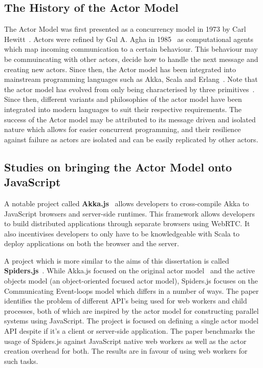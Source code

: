 \documentclass[12pt]{report}
\begin{document}
\subsection{The History of the Actor Model}
The Actor Model was first presented as a concurrency model in 1973 by Carl Hewitt~\cite{hewitt1973session}. Actors were refined by Gul A. Agha in 1985~\cite{agha1985actors} as computational agents which map incoming communication to a certain behaviour. This behaviour may be commuincating with other actors, decide how to handle the next message and creating new actors. Since then, the Actor model has been integrated into mainstream programming languages such as Akka, Scala and Erlang~\cite{43years}\cite{haller2012integration}. Note that the actor model has evolved from only being characterised by three primitives~\cite{agha1985actors}. Since then, different variants and philosophies of the actor model have been integrated into modern languages to suit their respective requirements. The success of the Actor model may be attributed to its message driven and isolated nature which allows for easier concurrent programming, and their resilience against failure as actors are isolated and can be easily replicated by other actors\cite{reactivemanifesto}.
\subsection{Studies on bringing the Actor Model onto JavaScript}
A notable project called \textbf{Akka.js}~\cite{stivan2015akka} allows developers to cross-compile Akka to JavaScript browsers and server-side runtimes. This framework allows developers to build distributed applications through separate browsers using WebRTC. It also incentivises developers to only have to be knowledgeable with Scala to deploy applications on both the browser and the server.

A project which is more similar to the aims of this dissertation is called \textbf{Spiders.js}~\cite{spidersjs}. While Akka.js focused on the original actor model~\cite{agha1985actors} and the active objects model (an object-oriented focused actor model), Spiders.js focuses on the Communicating Event-loops model which differs in a number of ways. The paper identifies the problem of different API's being used for web workers and child processes, both of which are inspired by the actor model for constructing parallel systems using JavaScript. The project is focused on defining a single actor model API despite if it's a client or server-side application. The paper benchmarks the usage of Spiders.js against JavaScript native web workers as well as the actor creation overhead for both. The results are in favour of using web workers for such tasks.
\end{document}
